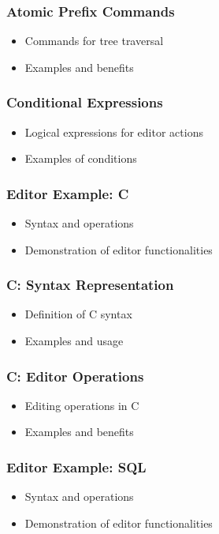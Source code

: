 \documentclass[t,24pt,aspectratio=169]{beamer}
\begin{document}
\begin{frame}[hvid]
    \frametitle{Atomic Prefix Commands}
    \begin{itemize}
        \item Commands for tree traversal
        \item Examples and benefits
    \end{itemize}
\end{frame}

\begin{frame}[hvid]
    \frametitle{Conditional Expressions}
    \begin{itemize}
        \item Logical expressions for editor actions
        \item Examples of conditions
    \end{itemize}
\end{frame}

\begin{frame}[hvid]
    \frametitle{Editor Example: C}
    \begin{itemize}
        \item Syntax and operations
        \item Demonstration of editor functionalities
    \end{itemize}
\end{frame}

\begin{frame}[hvid]
    \frametitle{C: Syntax Representation}
    \begin{itemize}
        \item Definition of C syntax
        \item Examples and usage
    \end{itemize}
\end{frame}

\begin{frame}[hvid]
    \frametitle{C: Editor Operations}
    \begin{itemize}
        \item Editing operations in C
        \item Examples and benefits
    \end{itemize}
\end{frame}

\begin{frame}[hvid]
    \frametitle{Editor Example: SQL}
    \begin{itemize}
        \item Syntax and operations
        \item Demonstration of editor functionalities
    \end{itemize}
\end{frame}
\end{document}
